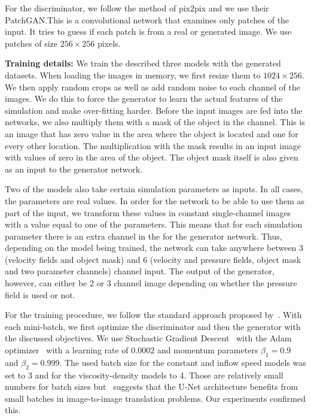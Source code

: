\documentclass{llncs}
\begin{document}
For the discriminator, we follow the method of pix2pix and we use their PatchGAN.\@ This is a convolutional network that examines only patches of the input. It tries to guess if each patch is from a real or generated image. We use patches of size $256\times 256$ pixels.

\noindent\textbf{Training details:} We train the described three models with the generated datasets. When loading the images in memory, we first resize them to $1024\times 256$. We then apply random crops as well as add random noise to each channel of the images. We do this to force the generator to learn the actual features of the simulation and make over-fitting harder. Before the input images are fed into the networks, we also multiply them with a mask of the object in the channel. This is an image that has zero value in the area where the object is located and one for every other location. The multiplication with the mask results in an input image with values of zero in the area of the object. The object mask itself is also given as an input to the generator network.

Two of the models also take certain simulation parameters as inputs. In all cases, the parameters are real values. In order for the network to be able to use them as part of the input, we transform these values in constant single-channel images with a value equal to one of the parameters. This means that for each simulation parameter there is an extra channel in the for the generator network. Thus, depending on the model being trained, the network can take anywhere between 3 (velocity fields and object mask) and 6 (velocity and pressure fields, object mask and two parameter channels) channel input. The output of the generator, however, can either be 2 or 3 channel image depending on whether the pressure field is used or not.

For the training procedure, we follow the standard approach proposed by~\cite{goodfellow2014}. With each mini-batch, we first optimize the discriminator and then the generator with the discussed objectives. We use Stochastic Gradient Descent~\cite{kiefer1952} with the Adam optimizer~\cite{kingma2014} with a learning rate of $0.0002$ and momentum parameters $\beta_1=0.9$ and $\beta_2=0.999$.
The used batch size for the constant and inflow speed models was set to 3 and for the viscosity-density models to 4. Those are relatively small numbers for batch sizes but~\cite{pix2pix} suggests that the U-Net architecture benefits from small batches in image-to-image translation problems. Our experiments confirmed this.
\end{document}
